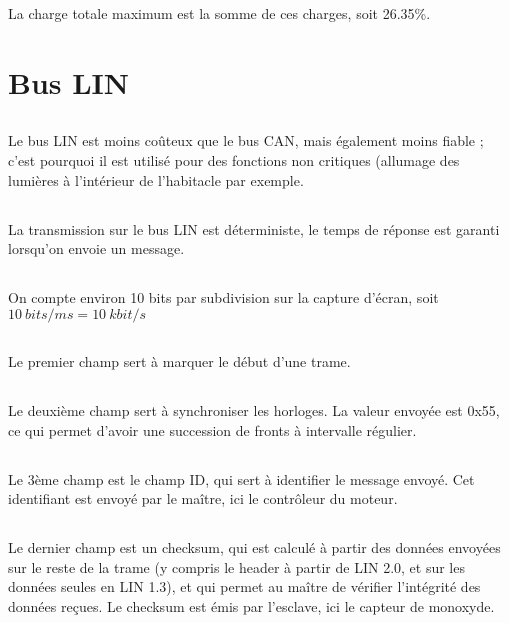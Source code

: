 \documentclass[a4paper]{article}
\begin{document}
La charge totale maximum est la somme de ces charges, soit 26.35\%.

\subsection{}
\todo{}


\section{Bus LIN}

\subsection{}
Le bus LIN est moins coûteux que le bus CAN, mais également moins fiable ; c'est pourquoi il est utilisé pour des fonctions non critiques (allumage des lumières à l'intérieur de l'habitacle par exemple.

\subsection{}
La transmission sur le bus LIN est déterministe, le temps de réponse est garanti lorsqu'on envoie un message.

\subsection{}
On compte environ 10 bits par subdivision sur la capture d'écran, soit $10~bits/ms = 10~kbit/s$

\subsection{}
Le premier champ sert à marquer le début d'une trame.

\subsection{}
Le deuxième champ sert à synchroniser les horloges. La valeur envoyée est 0x55, ce qui permet d'avoir une succession de fronts à intervalle régulier.

\subsection{}
Le 3ème champ est le champ ID, qui sert à identifier le message envoyé. Cet identifiant est envoyé par le maître, ici le contrôleur du moteur.

\subsection{}
Le dernier champ est un checksum, qui est calculé à partir des données envoyées sur le reste de la trame (y compris le header à partir de LIN 2.0, et sur les données seules en LIN 1.3), et qui permet au maître de vérifier l'intégrité des données reçues. Le checksum est émis par l'esclave, ici le capteur de monoxyde.
\end{document}
